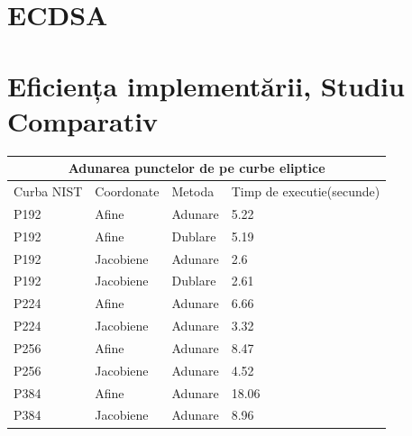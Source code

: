 \section{ECDSA}

\section{Eficiența implementării, Studiu Comparativ}

\begin{tabular}{ |p{3cm}||p{3cm}|p{3cm}|p{3cm}|  }
 \hline
 \multicolumn{4}{|c|}{Adunarea punctelor de pe curbe eliptice} \\
 \hline
 Curba NIST& Coordonate &Metoda &Timp de executie(secunde)\\
 \hline
 P192   & Afine    &Adunare& 5.22\\
 P192&Afine  & Dublare & 5.19\\
 P192 &Jacobiene & Adunare& 2.6\\
 P192&Jacobiene & Dublare & 2.61\\
 P224& Afine & Adunare & 6.66\\
 P224& Jacobiene & Adunare   &3.32\\
 P256& Afine  & Adunare& 8.47\\
 P256& Jacobiene  & Adunare& 4.52\\
 P384& Afine  & Adunare& 18.06\\
 P384& Jacobiene  & Adunare& 8.96\\
 \hline
\end{tabular}

